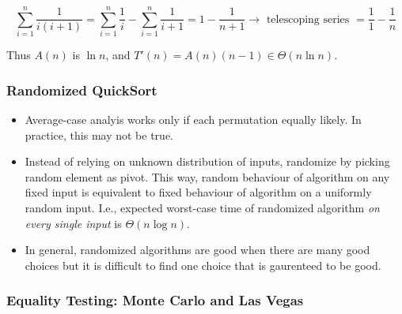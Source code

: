 $$ \sum_{i=1}^n \frac{1}{i(i+1)} = \sum_{i=1}^n \frac{1}{i} - \sum_{i=1}^n \frac{1}{i+1} = 1 - \frac{1}{n+1} \rightarrow \textrm{ telescoping series } = \frac{1}{1} - \frac{1}{n}$$

\noindent Thus $A(n)$ is $\ln n$, and $T'(n) = A(n)(n-1) \in \Theta(n \ln n)$.

\subsubsection*{Randomized QuickSort}

\begin{itemize}
	\item Average-case analyis works only if each permutation equally likely. In practice, this may not be true.
	\item Instead of relying on unknown distribution of inputs, randomize by picking random element as pivot. This way, random behaviour of algorithm on any fixed input is equivalent to fixed behaviour of algorithm on a uniformly random input. I.e., expected worst-case time of randomized algorithm \textit{on every single input} is $\Theta(n \log n)$.
	\item In general, randomized algorithms are good when there are many good choices but it is difficult to find one choice that is gaurenteed to be good.
\end{itemize}

\subsubsection*{Equality Testing: Monte Carlo and Las Vegas}


